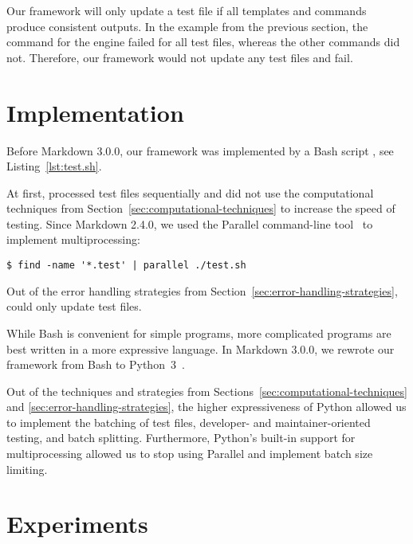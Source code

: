 \documentclass[final]{ltugboat}
\begin{document}
Our framework will only update a test file if all templates and commands produce consistent outputs. In the example from the previous section, the command for the  engine failed for all test files, whereas the other commands did not. Therefore, our framework would not update any test files and fail.

\section{Implementation}
\label{sec:implementation}

Before Markdown 3.0.0, our framework was implemented by a Bash script , see Listing~\ref{lst:test.sh}.

At first,  processed test files sequentially and did not use the computational techniques from Section~\ref{sec:computational-techniques} to increase the speed of testing. Since Markdown 2.4.0, we used the  Parallel command-line tool~\cite{tange2011gnu} to implement multiprocessing:
\begin{verbatim}
$ find -name '*.test' | parallel ./test.sh
\end{verbatim}
Out of the error handling strategies from Section~\ref{sec:error-handling-strategies},  could only update test files.

While Bash is convenient for simple programs, more complicated programs are best written in a more expressive language. In Markdown 3.0.0, we rewrote our framework from Bash to Python~3~\cite{novotny2023implement}.

Out of the techniques and strategies from Sections~\ref{sec:computational-techniques} and \ref{sec:error-handling-strategies}, the higher expressiveness of Python allowed us to implement the batching of test files, developer- and maintainer-oriented testing, and batch splitting. Furthermore, Python's built-in support for multiprocessing allowed us to stop using  Parallel and implement batch size limiting.

\section{Experiments}
\label{sec:experiments}
\end{document}
